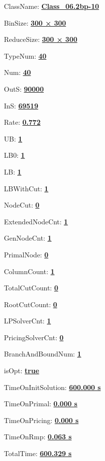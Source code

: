 \documentclass[11pt]{article}
\begin{document}
\pagestyle{empty}


ClassName: \underline{\textbf{Class_06.2bp-10}}
\par
BinSize: \underline{\textbf{300 × 300}}
\par
ReduceSize: \underline{\textbf{300 × 300}}
\par
TypeNum: \underline{\textbf{40}}
\par
Num: \underline{\textbf{40}}
\par
OutS: \underline{\textbf{90000}}
\par
InS: \underline{\textbf{69519}}
\par
Rate: \underline{\textbf{0.772}}
\par
UB: \underline{\textbf{1}}
\par
LB0: \underline{\textbf{1}}
\par
LB: \underline{\textbf{1}}
\par
LBWithCut: \underline{\textbf{1}}
\par
NodeCut: \underline{\textbf{0}}
\par
ExtendedNodeCnt: \underline{\textbf{1}}
\par
GenNodeCnt: \underline{\textbf{1}}
\par
PrimalNode: \underline{\textbf{0}}
\par
ColumnCount: \underline{\textbf{1}}
\par
TotalCutCount: \underline{\textbf{0}}
\par
RootCutCount: \underline{\textbf{0}}
\par
LPSolverCnt: \underline{\textbf{1}}
\par
PricingSolverCnt: \underline{\textbf{0}}
\par
BranchAndBoundNum: \underline{\textbf{1}}
\par
isOpt: \underline{\textbf{true}}
\par
TimeOnInitSolution: \underline{\textbf{600.000 s}}
\par
TimeOnPrimal: \underline{\textbf{0.000 s}}
\par
TimeOnPricing: \underline{\textbf{0.000 s}}
\par
TimeOnRmp: \underline{\textbf{0.063 s}}
\par
TotalTime: \underline{\textbf{600.329 s}}
\par
\newpage
\end{document}
